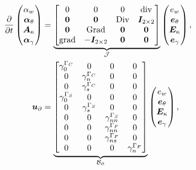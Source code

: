 \begin{equation}\label{eq:pHsysMin}
\begin{aligned}
\displaystyle
\diffp{}{t}
\begin{pmatrix}
\alpha_w \\
\bm\alpha_\theta \\
\bm{A}_\kappa \\
\bm\alpha_{\gamma} \\
\end{pmatrix} &= 
\underbrace{\begin{bmatrix}
0  & 0  & 0  & \div \\
\bm{0} & \bm{0} &  \Div & \bm{I}_{2 \times 2}\\
\bm{0}  & \Grad  & \bm{0}  & \bm{0}\\
\grad & -\bm{I}_{2 \times 2} &  \bm{0} & \bm{0} \\
\end{bmatrix}}_{\mathcal{J}}
\begin{pmatrix}
e_w \\
\bm{e}_{\theta} \\
\bm{E}_{\kappa} \\
\bm{e}_{\gamma} \\
\end{pmatrix}, \vspace{3pt}\\
\bm{u}_\partial &= \underbrace{
\begin{bmatrix}
\gamma_{0}^{\Gamma_C} & {0} & {0} & {0} \\
{0} & \gamma_n^{\Gamma_C} &  {0} & {0} \\
{0} & \gamma_s^{\Gamma_C} &  {0} & {0} \\
\gamma_{0}^{\Gamma_S} & {0} & {0} & {0} \\
{0} & \gamma_s^{\Gamma_S} & {0} & {0} \\
{0} &  {0} & \gamma_{nn}^{\Gamma_S} & {0} \\
{0} &  {0} & \gamma_{nn}^{\Gamma_F} & {0} \\
{0} &  {0} & \gamma_{ns}^{\Gamma_F} & {0} \\
{0} &  {0} & {0} & \gamma_{n}^{\Gamma_F} \\
\end{bmatrix}}_{\mathcal{B}_\partial} \begin{pmatrix}
e_w \\
\bm{e}_{\theta} \\
\bm{E}_{\kappa} \\
\bm{e}_{\gamma} \\
\end{pmatrix}, \vspace{3pt}\\

\end{aligned}
\end{equation}
